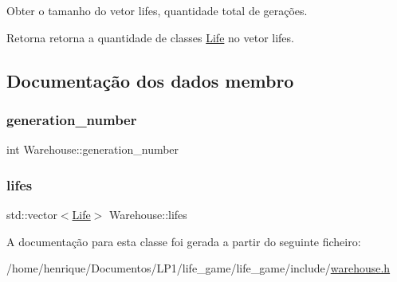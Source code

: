 Obter o tamanho do vetor lifes, quantidade total de gerações. \begin{DoxyReturn}{Retorna}
retorna a quantidade de classes \hyperlink{classLife}{Life} no vetor lifes. 
\end{DoxyReturn}


\subsection{Documentação dos dados membro}
\mbox{\label{classWarehouse_a379699c9693c068cdedbd54453e837fa}} 
\subsubsection{\texorpdfstring{generation\+\_\+number}{generation\_number}}
{\footnotesize\ttfamily int Warehouse\+::generation\+\_\+number\hspace{0.3cm}{\ttfamily [private]}}

\mbox{\label{classWarehouse_a6b2896ac60f5230a41460d7febcc1fbf}} 
\subsubsection{\texorpdfstring{lifes}{lifes}}
{\footnotesize\ttfamily std\+::vector$<$\hyperlink{classLife}{Life}$>$ Warehouse\+::lifes\hspace{0.3cm}{\ttfamily [private]}}



A documentação para esta classe foi gerada a partir do seguinte ficheiro\+:\begin{DoxyCompactItemize}
\item 
/home/henrique/\+Documentos/\+L\+P1/life\+\_\+game/life\+\_\+game/include/\hyperlink{warehouse_8h}{warehouse.\+h}\end{DoxyCompactItemize}
